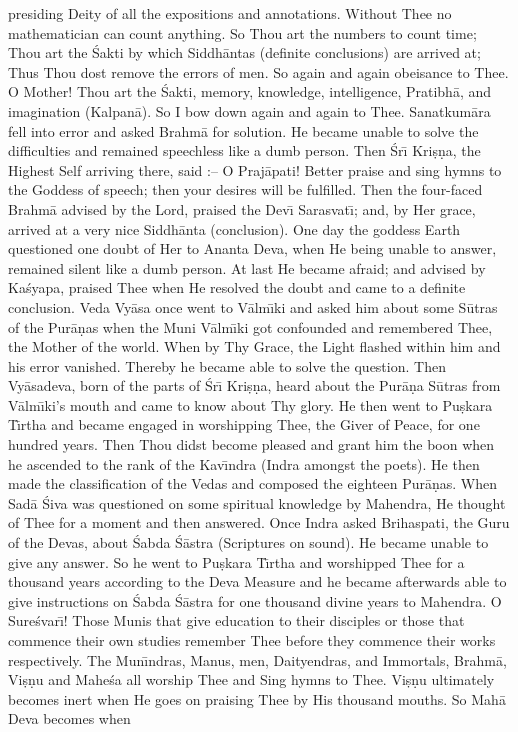 presiding Deity of all the expositions and annotations. Without Thee no mathematician can count anything. So Thou art the numbers to count time; Thou art the \'Sakti by which Siddh\=antas (definite conclusions) are arrived at; Thus Thou dost remove the errors of men. So again and again obeisance to Thee. O Mother! Thou art the \'Sakti, memory, knowledge, intelligence, Pratibh\=a, and imagination (Kalpan\=a). So I bow down again and again to Thee. Sanatkum\=ara fell into error and asked Brahm\=a for solution. He became unable to solve the difficulties and remained speechless like a dumb person. Then \'Sr\={\i} Kri\d{s}\d{n}a, the Highest Self arriving there, said :-- O Praj\=apati! Better praise and sing hymns to the Goddess of speech; then your desires will be fulfilled. Then the four-faced Brahm\=a advised by the Lord, praised the Dev\={\i} Sarasvat\={\i}; and, by Her grace, arrived at a very nice Siddh\=anta (conclusion). One day the goddess Earth questioned one doubt of Her to Ananta Deva, when He being unable to answer, remained silent like a dumb person. At last He became afraid; and advised by Ka\'syapa, praised Thee when He resolved the doubt and came to a definite conclusion. Veda Vy\=asa once went to V\=alm\={\i}ki and asked him about some S\=utras of the Pur\=a\d{n}as when the Muni V\=alm\={\i}ki got confounded and remembered Thee, the Mother of the world. When by Thy Grace, the Light flashed within him and his error vanished. Thereby he became able to solve the question. Then Vy\=asadeva, born of the parts of \'Sr\={\i} Kri\d{s}\d{n}a, heard about the Pur\=a\d{n}a S\=utras from V\=alm\={\i}ki's mouth and came to know about Thy glory. He then went to Pu\d{s}kara T\={\i}rtha and became engaged in worshipping Thee, the Giver of Peace, for one hundred years. Then Thou didst become pleased and grant him the boon when he ascended to the rank of the Kav\={\i}ndra (Indra amongst the poets). He then made the classification of the Vedas and composed the eighteen Pur\=a\d{n}as. When Sad\=a \'Siva was questioned on some spiritual knowledge by Mahendra, He thought of Thee for a moment and then answered. Once Indra asked Brihaspati, the Guru of the Devas, about \'Sabda \'S\=astra (Scriptures on sound). He became unable to give any answer. So he went to Pu\d{s}kara T\={\i}rtha and worshipped Thee for a thousand years according to the Deva Measure and he became afterwards able to give instructions on \'Sabda \'S\=astra for one thousand divine years to Mahendra. O Sure\'svar\={\i}! Those Munis that give education to their disciples or those that commence their own studies remember Thee before they commence their works respectively. The Mun\={\i}ndras, Manus, men, Daityendras, and Immortals, Brahm\=a, Vi\d{s}\d{n}u and Mahe\'sa all worship Thee and Sing hymns to Thee. Vi\d{s}\d{n}u ultimately becomes inert when He goes on praising Thee by His thousand mouths. So Mah\=a Deva becomes when

